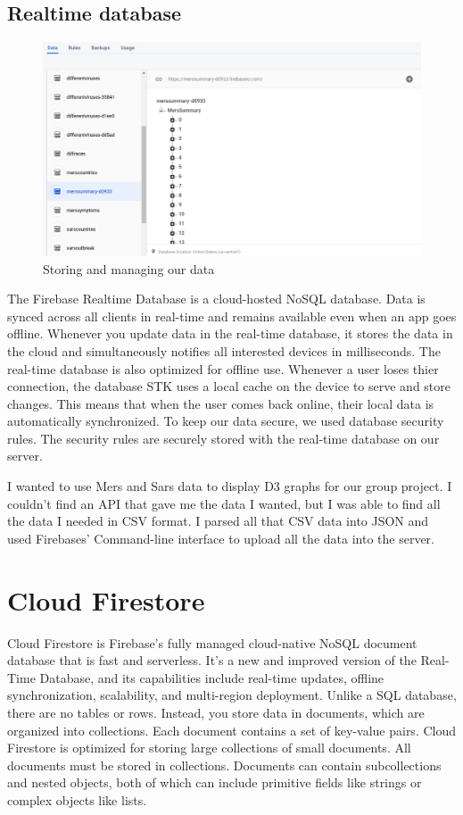 \subsection{Realtime database}

\begin{figure}
    \centering
    \includegraphics[scale=0.4]{img/Firebasedb.PNG}
    \caption{Storing and managing our data}
    \label{fig:my_label4}
\end{figure}

The Firebase Realtime Database is a cloud-hosted NoSQL database.
Data is synced across all clients in real-time and remains available even when an app goes offline.
Whenever you update data in the real-time database, it stores the data in the cloud and simultaneously notifies all interested devices in milliseconds. The real-time database is also optimized for offline use.
Whenever a user loses thier connection, the database STK uses a local cache on the device to serve and store changes. This means that when the user comes back online, their local data is automatically synchronized. To keep our data secure, we used database security rules.
The security rules are securely stored with the real-time database on our server.

I wanted to use Mers and Sars data to display D3 graphs for our group project.
I couldn’t find an API that gave me the data I wanted, but I was able to find all the data I needed in CSV format. 
I parsed all that CSV data into JSON and used Firebases’ Command-line interface to upload all the data into the server.


\section{Cloud Firestore}
Cloud Firestore is Firebase's fully managed cloud-native NoSQL document database that is fast and serverless. It's a new and improved version of the Real-Time Database, and its capabilities include real-time updates, offline synchronization, scalability, and multi-region deployment. Unlike a SQL database, there are no tables or rows. Instead, you store data in documents, which are organized into collections. Each document contains a set of key-value pairs.
Cloud Firestore is optimized for storing large collections of small documents.
All documents must be stored in collections. Documents can contain subcollections and nested objects, both of which can include primitive fields like strings or complex objects like lists.


